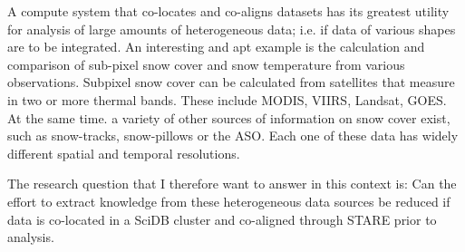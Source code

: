 \documentclass[a4paper,10pt]{article}
\begin{document}
A compute system that co-locates and co-aligns datasets has its greatest utility for
analysis of large amounts of heterogeneous data; i.e. if data of various shapes are to be integrated. An interesting and apt example is the calculation and comparison of sub-pixel snow cover and snow temperature from various observations.
Subpixel snow cover can be calculated from satellites that measure in two or more thermal bands. These include MODIS, VIIRS, Landsat, GOES.
At the same time. a variety of other sources of information on snow cover exist, such as snow-tracks, snow-pillows or the \gls{ASO}.
Each one of these data has widely different spatial and temporal resolutions.

The research question that I therefore want to answer in this context is:
Can the effort to extract knowledge from these heterogeneous data sources be reduced
if data is co-located in a SciDB cluster and co-aligned through STARE prior to analysis.




%
%
%
\end{document}
